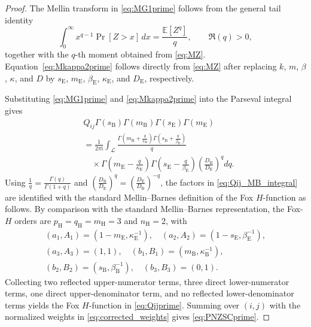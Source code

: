 \documentclass[lettersize,journal]{IEEEtran}
\begin{document}
\begin{proof}
The Mellin transform in \eqref{eq:MG1prime} follows from the general tail identity
\[
\int_0^\infty x^{q-1}\Pr[Z>x]\,dx
=
\frac{\mathbb E[Z^q]}{q},
\qquad \Re(q)>0,
\]
together with the \(q\)-th moment obtained from \eqref{eq:MZ}. Equation~\eqref{eq:Mkappa2prime} follows directly from \eqref{eq:MZ} after replacing \(k\), \(m\), \(\beta\), \(\kappa\), and \(D\) by \(s_{\mathrm E}\), \(m_{\mathrm E}\), \(\beta_{\mathrm E}\), \(\kappa_{\mathrm E}\), and \(D_{\mathrm E}\), respectively.

Substituting \eqref{eq:MG1prime} and \eqref{eq:Mkappa2prime} into the Parseval integral gives
\begin{equation}
\begin{aligned}
&Q_{ij}\Gamma(s_{\mathrm B})\Gamma(m_{\mathrm B})
\Gamma(s_{\mathrm E})\Gamma(m_{\mathrm E})\\
&=
\frac{1}{2\pi\mathrm i}
\int_{\mathcal L}
\frac{
\Gamma\!\left(m_{\mathrm B}+\frac{q}{\kappa_{\mathrm B}}\right)
\Gamma\!\left(s_{\mathrm B}+\frac{q}{\beta_{\mathrm B}}\right)}
{q}\\
&\quad\times
\Gamma\!\left(m_{\mathrm E}-\frac{q}{\kappa_{\mathrm E}}\right)
\Gamma\!\left(s_{\mathrm E}-\frac{q}{\beta_{\mathrm E}}\right)
\left(\frac{D_{\mathrm B}}{D_{\mathrm E}}\right)^q dq .
\end{aligned}
\label{eq:Qij_MB_integral}
\end{equation}
Using \(\frac{1}{q}=\frac{\Gamma(q)}{\Gamma(1+q)}\) and \(\left(\frac{D_{\mathrm B}}{D_{\mathrm E}}\right)^q=\left(\frac{D_{\mathrm E}}{D_{\mathrm B}}\right)^{-q}\), the factors in \eqref{eq:Qij_MB_integral} are identified with the standard Mellin--Barnes definition of the Fox \(H\)-function as follows. By comparison with the standard Mellin--Barnes representation, the Fox-\(H\) orders are \(p_{\mathrm H}=q_{\mathrm H}=m_{\mathrm H}=3\) and \(n_{\mathrm H}=2\), with
\[
\begin{gathered}
(a_1,A_1)=(1-m_{\mathrm E},\kappa_{\mathrm E}^{-1}),\quad
(a_2,A_2)=(1-s_{\mathrm E},\beta_{\mathrm E}^{-1}),\\
(a_3,A_3)=(1,1),\quad
(b_1,B_1)=(m_{\mathrm B},\kappa_{\mathrm B}^{-1}),\\
(b_2,B_2)=(s_{\mathrm B},\beta_{\mathrm B}^{-1}),\quad
(b_3,B_3)=(0,1).
\end{gathered}
\]
Collecting two reflected upper-numerator terms, three direct lower-numerator terms, one direct upper-denominator term, and no reflected lower-denominator terms yields the Fox \(H\)-function in \eqref{eq:Qijprime}. Summing over \((i,j)\) with the normalized weights in \eqref{eq:corrected_weights} gives \eqref{eq:PNZSCprime}.
\end{proof}
\end{document}
